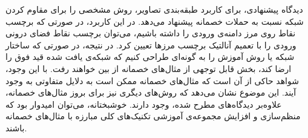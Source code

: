 \documentclass[12pt,onecolumn,a4paper]{article}
\begin{document}
دیدگاه پیشنهادی، برای کاربرد طبقه‌بندی تصاویر، روش مشخصی را برای مقاوم کردن شبکه نسبت به حملات خصمانه پیشنهاد می‌دهد. در این کاربرد، در صورتی که برچسب نقاط روی مرز دامنه‌ی ورودی را داشته باشیم، می‌توان برچسب نقاط فضای درونی ورودی را با تعمیم آنالتیک برچسب مرزها تعیین کرد. در نتیجه، در صورتی که ساختار شبکه یا روش آموزش را به گونه‌ای طراحی کنیم که شبکه‌ی یافت شده قید فوق را ارضا کند، بخش قابل توجهی از مثال‌های خصمانه از بین خواهند رفت. با این وجود، شواهد حاکی از آن است که مثال‌های خصمانه ممکن است به دلایل متفاوتی به وجود آیند. این موضوع نشان می‌دهد که روش‌های دیگری نیز برای بروز مثال‌های خصمانه، علاوه‌بر دیدگاه‌های مطرح شده، وجود دارند. خوشبختانه، می‌توان امیدوار بود که منظم‌سازی و افزایش مجموعه‌ی آموزشی تکنیک‌های کلی مبارزه با مثال‌های خصمانه باشند.

\setLTRbibitems


\end{document}
